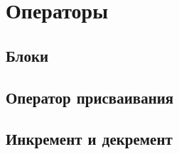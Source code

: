 \hypertarget{statements}{%
\section{Операторы}\label{stmt:chapter}}

\hypertarget{blocks}{%
\subsection{Блоки}\label{stmt:blocks}}

\hypertarget{assignment}{%
\subsection{Оператор присваивания}\label{stmt:assignment}}

\hypertarget{inc-dec}{%
\subsection{Инкремент и декремент}\label{stmt:inc-dec}}
